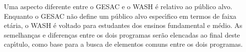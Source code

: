 \documentclass[
12pt,		%
openright,	%
twoside,  %
a4paper,			%
chapter=TITLE,		%
english,			%
french,				%
spanish,			%
brazil				%
]{USPSC-classe/USPSC}
\begin{document}
Uma aspecto diferente entre o GESAC e o WASH \'e relativo ao p\'ublico alvo. Enquanto o GESAC n\~ao define um p\'ublico alvo espec\'{\i}fico em termos de faixa et\'aria, o WASH \'e voltado para estudantes dos ensinos fundamental e m\'edio. As semelhan\c{c}as e diferen\c{c}as entre os dois programas ser\~ao elencadas ao final deste cap\'{\i}tulo, como base para a busca de elementos comuns entre os dois programas.



















\captionsetup{format=plain}
\begin{figure}[max size={\textwidth}{\textheight}]

\centering



\end{figure}
\end{document}
